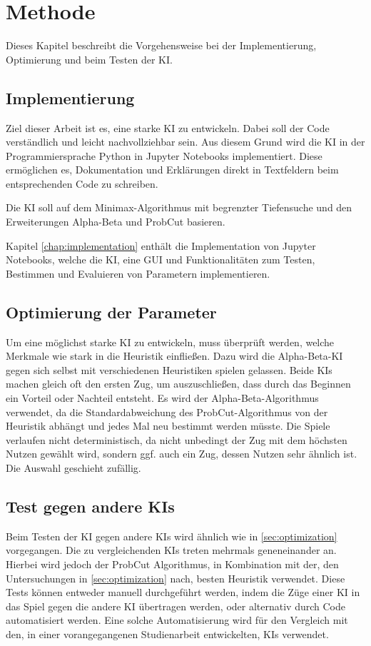 
\chapter{Methode}
\label{chap:methode}

Dieses Kapitel beschreibt die Vorgehensweise bei der Implementierung, Optimierung und beim Testen der \ac{KI}.

\section{Implementierung}
Ziel dieser Arbeit ist es, eine starke \ac{KI} zu entwickeln. Dabei soll der Code verständlich und leicht nachvollziehbar
sein. Aus diesem Grund wird die \ac{KI} in der Programmiersprache Python in Jupyter Notebooks implementiert. Diese
ermöglichen es, Dokumentation und Erklärungen direkt in Textfeldern beim entsprechenden Code zu schreiben.

Die \ac{KI} soll auf dem Minimax-Algorithmus mit begrenzter Tiefensuche und den Erweiterungen Alpha-Beta und ProbCut
basieren.

Kapitel \ref{chap:implementation} enthält die Implementation von Jupyter Notebooks, welche die \ac{KI}, eine \ac{GUI}
und Funktionalitäten zum Testen, Bestimmen und Evaluieren von Parametern implementieren.

\section{Optimierung der Parameter}
\label{sec:optimization}
Um eine möglichst starke \ac{KI} zu entwickeln, muss überprüft werden, welche Merkmale wie stark in die Heuristik einfließen.
Dazu wird die Alpha-Beta-\ac{KI} gegen sich selbst mit verschiedenen Heuristiken spielen gelassen. Beide \acp{KI} machen gleich
oft den ersten Zug, um auszuschließen, dass durch das Beginnen ein Vorteil oder Nachteil entsteht. Es wird der
Alpha-Beta-Algorithmus verwendet, da die Standardabweichung des ProbCut-Algorithmus von der Heuristik abhängt und jedes
Mal neu bestimmt werden müsste. Die Spiele verlaufen nicht deterministisch, da nicht unbedingt der Zug mit dem höchsten
Nutzen gewählt wird, sondern ggf. auch ein Zug, dessen Nutzen sehr ähnlich ist. Die Auswahl geschieht zufällig.

\section{Test gegen andere KIs}
Beim Testen der \ac{KI} gegen andere \acp{KI} wird ähnlich wie in \autoref{sec:optimization} vorgegangen. Die zu vergleichenden
\acp{KI} treten mehrmals geneneinander an. Hierbei wird jedoch der ProbCut Algorithmus, in Kombination mit der, den
Untersuchungen in \autoref{sec:optimization} nach, besten Heuristik verwendet. Diese Tests können entweder manuell
durchgeführt werden, indem die Züge einer \ac{KI} in das Spiel gegen die andere \ac{KI} übertragen werden, oder alternativ
durch Code automatisiert werden. Eine solche Automatisierung wird für den Vergleich mit den, in einer vorangegangenen
Studienarbeit entwickelten, \acp{KI} verwendet.

